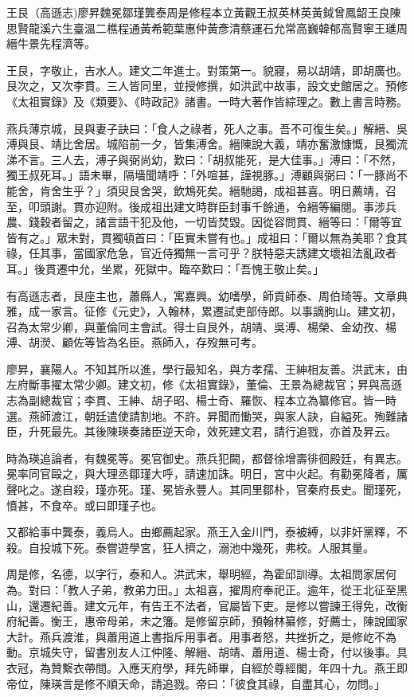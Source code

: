 
\begin{pinyinscope}
王艮（高遜志)廖昇魏冕鄒瑾龔泰周是修程本立黃觀王叔英林英黃鉞曾鳳韶王良陳思賢龍溪六生臺溫二樵程通黃希範葉惠仲黃彥清蔡運石允常高巍韓郁高賢寧王璡周縉牛景先程濟等。

王艮，字敬止，吉水人。建文二年進士。對策第一。貌寢，易以胡靖，即胡廣也。艮次之，又次李貫。三人皆同里，並授修撰，如洪武中故事，設文史館居之。預修《太祖實錄》及《類要》、《時政記》諸書。一時大著作皆綜理之。數上書言時務。

燕兵薄京城，艮與妻子訣曰：「食人之祿者，死人之事。吾不可復生矣。」解縉、吳溥與艮、靖比舍居。城陷前一夕，皆集溥舍。縉陳說大義，靖亦奮激慷慨，艮獨流涕不言。三人去，溥子與弼尚幼，歎曰：「胡叔能死，是大佳事。」溥曰：「不然，獨王叔死耳。」語未畢，隔墻聞靖呼：「外喧甚，謹視豚。」溥顧與弼曰：「一豚尚不能舍，肯舍生乎？」須臾艮舍哭，飲鴆死矣。縉馳謁，成祖甚喜。明日薦靖，召至，叩頭謝。貫亦迎附。後成祖出建文時群臣封事千餘通，令縉等編閱。事涉兵農、錢穀者留之，諸言語干犯及他，一切皆焚毀。因從容問貫、縉等曰：「爾等宜皆有之。」眾未對，貫獨頓首曰：「臣實未嘗有也。」成祖曰：「爾以無為美耶？食其祿，任其事，當國家危急，官近侍獨無一言可乎？朕特惡夫誘建文壞祖法亂政者耳。」後貫遷中允，坐累，死獄中。臨卒歎曰：「吾愧王敬止矣。」

有高遜志者，艮座主也，蕭縣人，寓嘉興。幼嗜學，師貢師泰、周伯琦等。文章典雅，成一家言。征修《元史》，入翰林，累遷試吏部侍郎。以事謫朐山。建文初，召為太常少卿，與董倫同主會試。得士自艮外，胡靖、吳溥、楊榮、金幼孜、楊溥、胡濙、顧佐等皆為名臣。燕師入，存歿無可考。

廖昇，襄陽人。不知其所以進，學行最知名，與方孝孺、王紳相友善。洪武末，由左府斷事擢太常少卿。建文初，修《太祖實錄》，董倫、王景為總裁官；昇與高遜志為副總裁官；李貫、王紳、胡子昭、楊士奇、羅恢、程本立為纂修官。皆一時選。燕師渡江，朝廷遣使請割地。不許。昇聞而慟哭，與家人訣，自縊死。殉難諸臣，升死最先。其後陳瑛奏諸臣逆天命，效死建文君，請行追戮，亦首及昇云。

時為瑛追論者，有魏冕等。冕官御史。燕兵犯闕，都督徐增壽徘徊殿廷，有異志。冕率同官毆之，與大理丞鄒瑾大呼，請速加誅。明日，宮中火起。有勸冕降者，厲聲叱之。遂自殺，瑾亦死。瑾、冕皆永豐人。其同里鄒朴，官秦府長史。聞瑾死，憤甚，不食卒。或曰即瑾子也。

又都給事中龔泰，義烏人。由鄉薦起家。燕王入金川門，泰被縛，以非奸黨釋，不殺。自投城下死。泰嘗遊學宮，狂人擠之，溺池中幾死，弗校。人服其量。

周是修，名德，以字行，泰和人。洪武末，舉明經，為霍邱訓導。太祖問家居何為。對曰：「教人子弟，教弟力田。」太祖喜，擢周府奉祀正。逾年，從王北征至黑山，還遷紀善。建文元年，有告王不法者，官屬皆下吏。是修以嘗諫王得免，改衡府紀善。衡王，惠帝母弟，未之籓。是修留京師，預翰林纂修，好薦士，陳說國家大計。燕兵渡淮，與蕭用道上書指斥用事者。用事者怒，共挫折之，是修屹不為動。京城失守，留書別友人江仲隆、解縉、胡靖、蕭用道、楊士奇，付以後事。具衣冠，為贊繫衣帶間。入應天府學，拜先師畢，自經於尊經閣，年四十九。燕王即帝位，陳瑛言是修不順天命，請追戮。帝曰：「彼食其祿，自盡其心，勿問。」


\end{pinyinscope}
